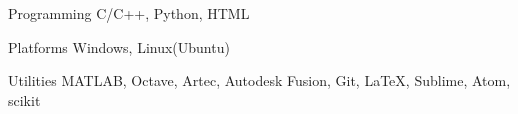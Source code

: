 

\begin{cvskills}


  \cvskill
  {Programming}
  {C/C++, Python, HTML}


  \cvskill
  {Platforms}
  {Windows, Linux(Ubuntu)}


  \cvskill
  {Utilities}
  {MATLAB, Octave, Artec, Autodesk Fusion, Git, \LaTeX, Sublime, Atom, scikit}


\end{cvskills}